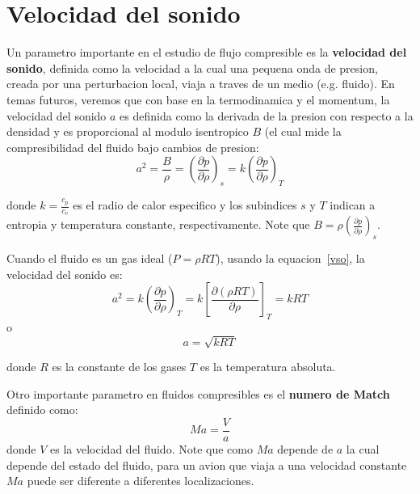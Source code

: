 \documentclass[10pt, oneside]{article}
\begin{document}
\section{Velocidad del sonido}
Un parametro importante en el estudio de flujo compresible es la \textbf{velocidad del sonido}, definida como la velocidad a la cual una pequena onda de presion, creada por una perturbacion local, viaja a traves de un medio (e.g. fluido). En temas futuros, veremos que con base en la termodinamica y el momentum, la velocidad del sonido $a$ es definida como la derivada de la presion con respecto a la densidad y es proporcional al modulo isentropico $B$ (el cual mide la compresibilidad del fluido bajo cambios de presion:
\begin{equation}
a^2 = \frac{B}{\rho} = \left (\frac{\partial p}{\partial \rho} \right )_s = k \left (\frac{\partial p}{\partial \rho} \right )_T 
\label{vso}
\end{equation}

donde $k=\frac{c_p}{c_v}$ es el radio de calor especifico y los subindices $s$ y $T$ indican a entropia y temperatura constante, respectivamente. Note que $B= \rho \left (\frac{\partial p}{\partial \rho} \right )_s$. 

Cuando el fluido es  un gas ideal ($P=\rho RT$), usando la equacion~\ref{vso}, la velocidad del sonido es:
\begin{equation}
a^2 = k \left (\frac{\partial p}{\partial \rho} \right )_T = k \left[ \frac{\partial (\rho RT)}{\partial \rho} \right]_T = kRT
\end{equation}
o
\begin{equation}
a = \sqrt{kRT}
\end{equation}

donde $R$ es la constante de los gases $T$ es la temperatura absoluta. 

Otro importante parametro en fluidos compresibles es el \textbf{numero de Match} definido como:
\begin{equation}
Ma = \frac{V}{a}
\end{equation}
donde $V$ es la velocidad del fluido. Note que como $Ma$ depende de $a$ la cual depende del estado del fluido, para un avion que viaja a una velocidad constante $Ma$ puede ser diferente a diferentes localizaciones.
\end{document}

